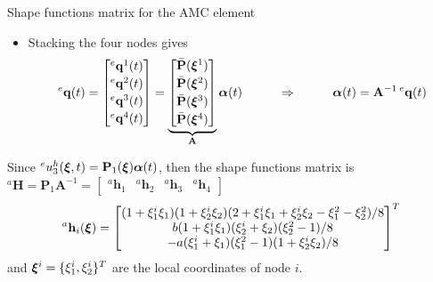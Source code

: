 \documentclass[aspectratio=169]{beamer}
\begin{document}
{
\color{white}
\begin{frame}{Shape functions matrix for the AMC element}
  \begin{itemize}
    \small
    \item Stacking the four nodes gives
          $${}^e\mathbf  q(t)=\begin{bmatrix}
              {}^e\mathbf  q^1(t) \\[2pt] {}^e\mathbf  q^2(t) \\[2pt] {}^e\mathbf  q^3(t) \\[2pt] {}^e\mathbf  q^4(t)
            \end{bmatrix}=\underbrace{\begin{bmatrix}
                \bar{\mathbf P}(\boldsymbol\xi^1) \\[2pt] \bar{\mathbf P}(\boldsymbol\xi^2) \\[2pt] \bar{\mathbf P}(\boldsymbol\xi^3) \\[2pt]\bar{\mathbf P}(\boldsymbol\xi^4)
              \end{bmatrix}}_\text{$\mathbf A$}\boldsymbol{\alpha}(t)\hspace{1cm}\Rightarrow\hspace{1cm} \boldsymbol{\alpha}(t)=\mathbf A^{-1}\,{}^e\mathbf  q(t)$$
  \end{itemize}
  \begin{tcolorbox}[colback=darkred!10,colframe=darkred!40!black]
    \small
    Since ${}^e u_3^h(\boldsymbol\xi,t)=\mathbf P_1(\boldsymbol\xi)\boldsymbol{\alpha}(t)$, then the shape functions matrix is ${}^a\mathbf H=\mathbf P_1\mathbf A^{-1}=\begin{bmatrix}
        {}^a \mathbf h_1 & {}^a\mathbf  h_2 & {}^a \mathbf h_3 & {}^a\mathbf  h_4
      \end{bmatrix}$
    $$ {}^a\mathbf  h_i(\boldsymbol\xi) =\begin{bmatrix}
        (1 + \xi_1^i \xi_1)(1 + \xi_2^i \xi_2)(2 + \xi_1^i \xi_1 + \xi_2^i \xi_2 - \xi_1^2 - \xi_2^2)/8 \\
        b(1 + \xi_1^i \xi_1)(\xi_2^i + \xi_2)(\xi_2^2 - 1)/8                                            \\
        -a(\xi_1^i + \xi_1)(\xi_1^2 - 1)(1 + \xi_2^i \xi_2)/8
      \end{bmatrix}^T$$
    and $\boldsymbol\xi^i=\{\xi_1^i,\xi_2^i\}^T$ are the local coordinates of node $i$.
  \end{tcolorbox}
\end{frame}

}
\end{document}
